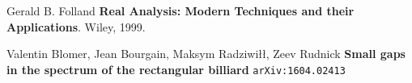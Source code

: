 \documentclass[12pt]{article}
\begin{document}
\vfill

\begin{thebibliography}{}

\item Gerald B. Folland \textbf{Real Analysis: Modern Techniques and their Applications}.  Wiley, 1999.

\item Valentin Blomer, Jean Bourgain, Maksym Radziwi\l\l, Zeev Rudnick \textbf{Small gaps in the spectrum of the rectangular billiard} \texttt{arXiv:1604.02413}

\end{thebibliography}
\end{document}
